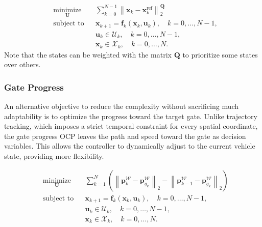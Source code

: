 \begin{equation}
\begin{aligned}
 & \underset{\mathbf{U}}{\text{minimize}} & & \sum_{k=0}^{N-1} \left\| \boldsymbol{x}_k - 
        \boldsymbol{x}_k^{\text{ref}} \right\|_{2}^{\mathbf{Q}} \\%
 & \text{subject to} & & \boldsymbol{x}_{k+1} = \mathbf{f}_{k}(\boldsymbol{x}_{k}, 
        \boldsymbol{u}_{k}), \quad k = 0, \dots, N-1, \\
& & & \boldsymbol{u}_{k} \in \mathcal{U}_{k}, \quad k = 0, \dots, N-1, \\
& & & \boldsymbol{x}_{k} \in \mathcal{X}_{k}, \quad k = 0, \dots, N.
\end{aligned}
\label{tt-ocp}
\end{equation}
Note that the states can be weighted with the matrix $\mathbf{Q}$ to prioritize some states over others.


\subsubsection{Gate Progress}
An alternative objective to reduce the complexity without sacrificing much adaptability is to optimize the progress toward the target gate.
Unlike trajectory tracking, which imposes a strict temporal constraint for every spatial coordinate, the gate progress \ac{OCP} leaves the path and speed toward the gate as decision variables.
This allows the controller to dynamically adjust to the current vehicle state, providing more flexibility.

\begin{equation}\begin{aligned}
& \underset{\mathbf{U}}{\text{minimize}} & & \sum_{k=1}^{N} \left(  \left\| \mathbf{p}_{k}^\mathcal{W} - \mathbf{p}_{g_k}^\mathcal{W} \right\|_2 - \left\| \mathbf{p}_{k-1}^\mathcal{W} - \mathbf{p}_{g_k}^\mathcal{W} \right\|_2 \right) \\
& \text{subject to} & & \boldsymbol{x}_{k+1} = \mathbf{f}_{k}(\boldsymbol{x}_{k}, \boldsymbol{u}_{k}), \quad k = 0, \dots, N-1, \\
& & & \boldsymbol{u}_{k} \in \mathcal{U}_{k}, \quad k = 0, \dots, N-1, \\
& & & \boldsymbol{x}_{k} \in \mathcal{X}_{k}, \quad k = 0, \dots, N.
\end{aligned}
\end{equation}


